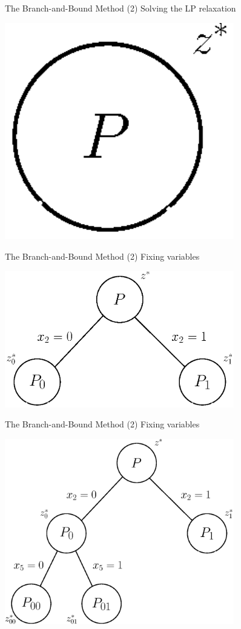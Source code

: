 \documentclass[10pt]{beamer}
\begin{document}
\begin{frame}[t]{The Branch-and-Bound Method (2)}
    Solving the LP relaxation
    \begin{center}
        \includegraphics[width=10cm]{b_and_b000.eps} 
    \end{center}
\end{frame}

\begin{frame}[t]{The Branch-and-Bound Method (2)}
    Fixing variables
    \begin{center}
        \includegraphics[width=10cm]{b_and_b001.eps} 
    \end{center}
\end{frame}

\begin{frame}[t]{The Branch-and-Bound Method (2)}
    Fixing variables
    \begin{center}
        \includegraphics[width=10cm]{b_and_b002.eps} 
    \end{center}
\end{frame}
\end{document}
